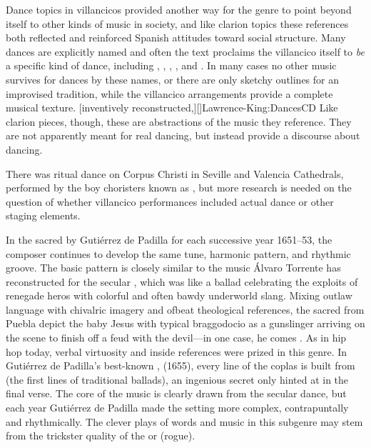 Dance topics in villancicos provided another way for the genre to point beyond
itself to other kinds of music in society, and like clarion topics these
references both reflected and reinforced Spanish attitudes toward social
structure.
Many dances are explicitly named and often the text proclaims the villancico
itself to \emph{be} a specific kind of dance, including ,
, , , and
.
In many cases no other music survives for dances by these names, or there are
only sketchy outlines for an improvised tradition, while the villancico
arrangements provide a complete musical texture.%
    \Autocite[For example,][]{Ruiz:Luz}
    [inventively reconstructed,][]{Lawrence-King:DancesCD}
Like clarion pieces, though, these are abstractions of the music they
reference.
They are not apparently meant for real dancing, but instead provide a discourse
about dancing.%
\begin{Footnote}
    There was ritual dance on Corpus Christi in Seville and Valencia
    Cathedrals, performed by the boy choristers known as , but
    more research is needed on the question of whether villancico performances
    included actual dance or other staging elements.%
    \Autocite{Comes:Danzas}
\end{Footnote}

In the sacred  by Gutiérrez de Padilla for each successive year
1651--53, the composer continues to develop the same tune, harmonic pattern,
and rhythmic groove.
The basic pattern is closely similar to the music Álvaro Torrente has
reconstructed for the secular , which was like a ballad
celebrating the exploits of renegade heros with colorful and often bawdy
underworld slang.%
    \Autocites
    {Torrente:Jacara}
    [512--514]{Torrente:VC-chapter}
Mixing outlaw language with chivalric imagery and ofbeat theological
references, the sacred  from Puebla depict the baby Jesus with
typical braggodocio as a gunslinger arriving on the scene to finish off a feud
with the devil---in one case, he comes .
As in hip hop today, verbal virtuosity and inside references were prized in this
genre. 
In Gutiérrez de Padilla's best-known ,  (1655), every line of the coplas is built from  (the first lines of traditional  ballads), an
ingenious secret only hinted at in the final verse.
The core of the music is clearly drawn from the secular dance, but each year
Gutiérrez de Padilla made the setting more complex, contrapuntally and
rhythmically.
The clever plays of words and music in this subgenre may stem from the
trickster quality of the  or  (rogue).

